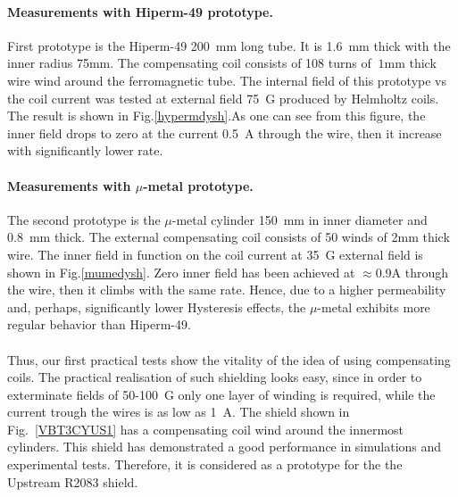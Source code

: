 \documentclass[12pt]{article}
\begin{document}
\paragraph{Measurements with Hiperm-49 prototype.}
First   prototype is the Hiperm-49 200~mm long tube. It is   1.6~mm thick with the inner radius 
75mm. The compensating coil consists of 108 turns of $~1$mm thick wire wind around the 
ferromagnetic tube. The internal field of this  prototype vs the coil current 
was tested at external field 75~G  produced by Helmholtz coils. 
The result is shown  in Fig.\ref{hypermdysh}.As one can see from this figure, the 
inner field drops to zero at the current 0.5~A through the wire, then it increase  with  
significantly lower rate.
\paragraph{Measurements with $\mu$-metal prototype.}
The second prototype is the $\mu$-metal cylinder  150~mm in inner  diameter and 0.8~mm  thick.
The external compensating coil consists of 50 winds of 2mm thick wire.
The inner field in function on the coil current  at 35~G  external field  is
shown  in Fig.\ref{mumedysh}. Zero inner field has been achieved  at   
$\approx$0.9A through the wire, then it climbs with the same rate.  
Hence, due to a higher permeability and, perhaps, significantly  lower  
Hysteresis effects,  the $\mu$-metal exhibits  more regular behavior than  Hiperm-49.
\paragraph{}
Thus, our first practical tests show the vitality of
the idea of using compensating coils. The practical realisation of such 
shielding looks easy, since in order to exterminate fields of 50-100~G
only one layer of winding is required, while the current trough the wires
is as low as 1~A. 
The shield  shown in Fig.~\ref{VBT3CYUS1} has a compensating coil wind around the innermost cylinders.
This shield has demonstrated  a good performance in  simulations  and experimental tests.
Therefore, it is  considered  as a prototype for the    the Upstream R2083 shield.

\end{document}
